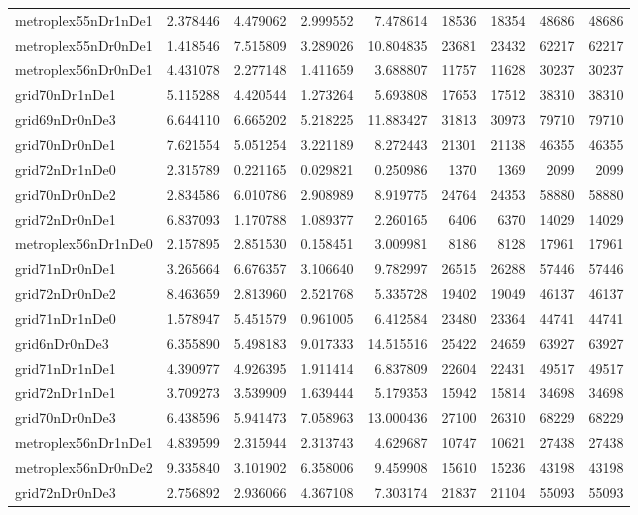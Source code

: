 \begin{longtable}{|l|r|r|r|r|r|r|r|r|}
metroplex55nDr1nDe1 & 2.378446 & 4.479062 & 2.999552 & 7.478614 & 18536 & 18354 & 48686 & 48686 \\
metroplex55nDr0nDe1 & 1.418546 & 7.515809 & 3.289026 & 10.804835 & 23681 & 23432 & 62217 & 62217 \\
metroplex56nDr0nDe1 & 4.431078 & 2.277148 & 1.411659 & 3.688807 & 11757 & 11628 & 30237 & 30237 \\
grid70nDr1nDe1 & 5.115288 & 4.420544 & 1.273264 & 5.693808 & 17653 & 17512 & 38310 & 38310 \\
grid69nDr0nDe3 & 6.644110 & 6.665202 & 5.218225 & 11.883427 & 31813 & 30973 & 79710 & 79710 \\
grid70nDr0nDe1 & 7.621554 & 5.051254 & 3.221189 & 8.272443 & 21301 & 21138 & 46355 & 46355 \\
grid72nDr1nDe0 & 2.315789 & 0.221165 & 0.029821 & 0.250986 & 1370 & 1369 & 2099 & 2099 \\
grid70nDr0nDe2 & 2.834586 & 6.010786 & 2.908989 & 8.919775 & 24764 & 24353 & 58880 & 58880 \\
grid72nDr0nDe1 & 6.837093 & 1.170788 & 1.089377 & 2.260165 & 6406 & 6370 & 14029 & 14029 \\
metroplex56nDr1nDe0 & 2.157895 & 2.851530 & 0.158451 & 3.009981 & 8186 & 8128 & 17961 & 17961 \\
grid71nDr0nDe1 & 3.265664 & 6.676357 & 3.106640 & 9.782997 & 26515 & 26288 & 57446 & 57446 \\
grid72nDr0nDe2 & 8.463659 & 2.813960 & 2.521768 & 5.335728 & 19402 & 19049 & 46137 & 46137 \\
grid71nDr1nDe0 & 1.578947 & 5.451579 & 0.961005 & 6.412584 & 23480 & 23364 & 44741 & 44741 \\
grid6nDr0nDe3 & 6.355890 & 5.498183 & 9.017333 & 14.515516 & 25422 & 24659 & 63927 & 63927 \\
grid71nDr1nDe1 & 4.390977 & 4.926395 & 1.911414 & 6.837809 & 22604 & 22431 & 49517 & 49517 \\
grid72nDr1nDe1 & 3.709273 & 3.539909 & 1.639444 & 5.179353 & 15942 & 15814 & 34698 & 34698 \\
grid70nDr0nDe3 & 6.438596 & 5.941473 & 7.058963 & 13.000436 & 27100 & 26310 & 68229 & 68229 \\
metroplex56nDr1nDe1 & 4.839599 & 2.315944 & 2.313743 & 4.629687 & 10747 & 10621 & 27438 & 27438 \\
metroplex56nDr0nDe2 & 9.335840 & 3.101902 & 6.358006 & 9.459908 & 15610 & 15236 & 43198 & 43198 \\
grid72nDr0nDe3 & 2.756892 & 2.936066 & 4.367108 & 7.303174 & 21837 & 21104 & 55093 & 55093 \\

\end{longtable}
